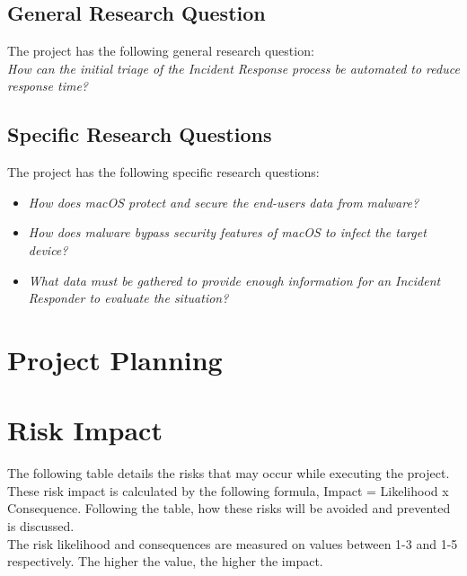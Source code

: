 \documentclass[11pt,a4paper]{article}
\begin{document}
\subsection{General Research Question}

The project has the following general research question:\\

\textit{How can the initial triage of the Incident Response process be automated to reduce response time?}

\subsection{Specific Research Questions}

The project has the following specific research questions:\\

\begin{itemize}
	\item{\textit{How does macOS protect and secure the end-users data from malware?}}
	\item{\textit{How does malware bypass security features of macOS to infect the target device?}}
	\item{\textit{What data must be gathered to provide enough information for an Incident Responder to evaluate the situation?}}
\end{itemize}


\newpage

\section{Project Planning}

\newpage 

\section{Risk Impact}

The following table details the risks that may occur while executing the project. These risk impact is calculated by the following formula, Impact = Likelihood x Consequence. Following the table, how these risks will be avoided and prevented is discussed. \\

The risk likelihood and consequences are measured on values between 1-3 and 1-5 respectively. The higher the value, the higher the impact.
\end{document}
